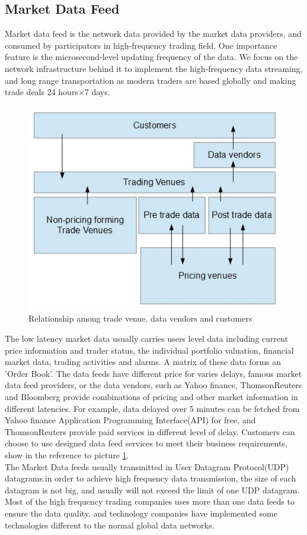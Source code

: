 \documentclass[11pt,openright,a4paper]{report}
\begin{document}
\subsection{Market Data Feed}
Market data feed is the network data provided by the market data providers, and consumed by participators in high-frequency trading field. One importance feature is the microsecond-level updating frequency of the data. We focus on the network infrastructure behind it to implement the high-frequency data streaming, and long range transportation as modern traders are based globally and making trade deals 24 hours$\times$7 days\cite{chlistalla2011high}.\\
\begin{figure}[H] 
	\centering\includegraphics[width=0.7\linewidth]{picture/tradevenue.PNG} 
	\caption{Relationship among trade venue, data vendors and customers}
	\label{fig:1} 
\end{figure} 
The low latency market data usually carries users level data including current price information and trader status, the individual portfolio valuation, financial market data, trading activities and alarms. A matrix of these data forms an 'Order Book'\cite{menkveld2013high}. The data feeds have different price for varies delays, famous market data feed providers, or the data vendors, such as Yahoo finance, ThomsonReuters and Bloomberg provide combinations of pricing and other market information in different latencies\cite{hasbrouck2013low}. For example, data delayed over 5 minutes can be fetched from Yahoo finance Application Programming Interface(API) for free\cite{financeyahoo}, and ThomsonReuters provide paid services in different level of delay. Customers can choose to use designed data feed services to meet their business requirements, show in the reference to picture \ref{fig:1}.\\
The Market Data feeds usually transmitted in User Datagram Protocol(UDP) datagrams\cite{brook2015low}.in order to achieve high frequency data transmission, the size of each datagram is not big, and usually will not exceed the limit of one UDP datagram.\\
Most of the high frequency trading companies uses more than one data feeds to ensure the data quality, and technology companies have implemented some technologies different to the normal global data networks.\\
\end{document}
